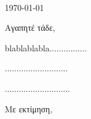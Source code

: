 \documentclass[11pt,a4paper]{letter} %
\def\opening#1{\thispagestyle{empty}
{\centering\fromaddress \vspace{1.3in} \\ %
\hspace*{\longindentation}\hfill\today\hspace*{\fill}\par} %
{\raggedright  \toaddress \par} %
\vspace{0.2in} %
\noindent #1 %
}
\begin{document}

\begin{letter}



\opening{Αγαπητέ τάδε,}

blablablabla................

...........................

............................

\closing{Με εκτίμηση,}


\end{letter}
\end{document}
